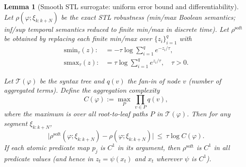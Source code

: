 \documentclass[journal]{IEEEtran}
\newtheorem{lemma}{Lemma}
\theoremstyle{definition}
\begin{document}
\begin{lemma}[Smooth STL surrogate: uniform error bound and differentiability]
\label{lem:smooth}
Let $\rho(\varphi;\xi_{k:k+N})$ be the exact STL robustness (min/max Boolean semantics; inf/sup temporal semantics reduced to finite min/max in discrete time). Let $\rho^{\mathrm{soft}}$ be obtained by replacing each finite min/max over $\{z_i\}_{i=1}^{q}$ with
\begin{align*}
\mathrm{smin}_\tau(z):&=-\tau\log\!\sum_{i=1}^{q}e^{-z_i/\tau},\\
\mathrm{smax}_\tau(z):&=\tau\log\!\sum_{i=1}^{q}e^{z_i/\tau},\quad \tau>0.
\end{align*}
 
Let $\mathcal{T}(\varphi)$ be the syntax tree and $q(v)$ the fan-in of node $v$ (number of aggregated terms).
Define the \emph{aggregation complexity}
\[
C(\varphi):=\max_{P}\ \prod_{v\in P} q(v),
\]
where the maximum is over all root-to-leaf paths $P$ in $\mathcal{T}(\varphi)$. Then for any segment $\xi_{k:k+N}$,
\[
\big|\rho^{\mathrm{soft}}(\varphi;\xi_{k:k+N})-\rho(\varphi;\xi_{k:k+N})\big|\ \le\ \tau\log C(\varphi).
\]
If each atomic predicate map $p_j$ is $C^1$ in its argument, then $\rho^{\mathrm{soft}}$ is $C^1$ in all predicate values (and hence in $z_t=\psi(x_t)$ and $x_t$ wherever $\psi$ is $C^1$).
\end{lemma}
\end{document}
